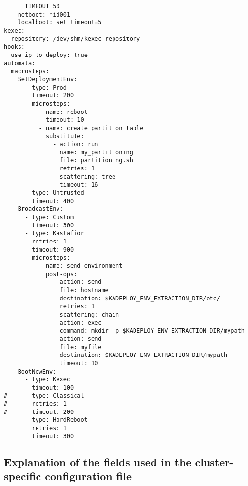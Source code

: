 \documentclass[a4wide,10pt,oneside]{book}
\begin{document}
\begin{small}
\begin{verbatim}
      TIMEOUT 50
    netboot: *id001
    localboot: set timeout=5
kexec:
  repository: /dev/shm/kexec_repository
hooks:
  use_ip_to_deploy: true
automata:
  macrosteps:
    SetDeploymentEnv:
      - type: Prod
        timeout: 200
        microsteps:
          - name: reboot
            timeout: 10
          - name: create_partition_table
            substitute:
              - action: run
                name: my_partitioning
                file: partitioning.sh
                retries: 1
                scattering: tree
                timeout: 16
      - type: Untrusted
        timeout: 400
    BroadcastEnv:
      - type: Custom
        timeout: 300
      - type: Kastafior
        retries: 1
        timeout: 900
        microsteps:
          - name: send_environment
            post-ops:
              - action: send
                file: hostname
                destination: $KADEPLOY_ENV_EXTRACTION_DIR/etc/
                retries: 1
                scattering: chain
              - action: exec
                command: mkdir -p $KADEPLOY_ENV_EXTRACTION_DIR/mypath
              - action: send
                file: myfile
                destination: $KADEPLOY_ENV_EXTRACTION_DIR/mypath
                timeout: 10
    BootNewEnv:
      - type: Kexec
        timeout: 100
#     - type: Classical
#       retries: 1
#       timeout: 200
      - type: HardReboot
        retries: 1
        timeout: 300
\end{verbatim}
\end{small}

\subsection{Explanation of the fields used in the cluster-specific configuration file\label{sec:specific_config}}
\end{document}
